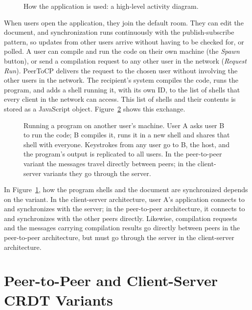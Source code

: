 \begin{figure}[htbp]
    \centering
    
    \caption{How the application is used: a high-level activity diagram.}
    \label{fig:activity}
\end{figure}

When users open the application, they join the default room. They can edit the document, and synchronization runs continuously with the publish-subscribe pattern, so updates from other users arrive without having to be checked for, or polled. A user can compile and run the code on their own machine (the \emph{Spawn} button), or send a compilation request to any other user in the network (\emph{Request Run}). PeerToCP delivers the request to the chosen user without involving the other users in the network. The recipient's system compiles the code, runs the program, and adds a shell running it, with its own ID, to the list of shells that every client in the network can access. This list of shells and their contents is stored as a JavaScript object. Figure~\ref{fig:4:request-run} shows this exchange.

\begin{figure}[htbp]
    \centering
    
    \caption[Running a program on another user's machine]{Running a program on another user's machine. User A asks user B to run the code; B compiles it, runs it in a new shell and shares that shell with everyone. Keystrokes from any user go to B, the host, and the program's output is replicated to all users. In the peer-to-peer variant the messages travel directly between peers; in the client-server variants they go through the server.}
    \label{fig:4:request-run}
\end{figure}

In Figure~\ref{fig:activity}, how the program shells and the document are synchronized depends on the variant. In the client-server architecture, user A's application connects to and synchronizes with the server; in the peer-to-peer architecture, it connects to and synchronizes with the other peers directly. Likewise, compilation requests and the messages carrying compilation results go directly between peers in the peer-to-peer architecture, but must go through the server in the client-server architecture.

\section{Peer-to-Peer and Client-Server CRDT Variants}
\label{sec:desain_crdt}

